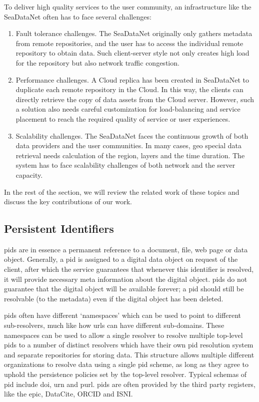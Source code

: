 \documentclass[conference]{IEEEtran}
\begin{document}
To deliver high quality services to the user community, an infrastructure like the SeaDataNet often has to face several challenges:
\begin{enumerate}
    \item Fault tolerance challenges. The SeaDataNet originally only gathers metadata from remote repositories, and the user has to access the individual remote repository to obtain data. Such client-server style not only creates high load for the repository but also network traffic congestion.
    \item Performance challenges. A Cloud replica has been created in SeaDataNet to duplicate each remote repository in the Cloud. In this way, the clients can directly retrieve the copy of data assets from the Cloud server. However, such a solution also needs careful customization for load-balancing and service placement to reach the required quality of service or user experiences.
    \item Scalability challenges. The SeaDataNet faces the continuous growth of both data providers and the user communities. In many cases, geo special data retrieval needs calculation of the region, layers and the time duration. The system has to face scalability challenges of both network and the server capacity. 
\end{enumerate}
In the rest of the section, we will review the related work of these topics and discuss the key contributions of our work. 

\subsection{Persistent Identifiers}
\label{sec:pids}

\glspl{pid} are in essence a permanent reference to a document, file, web page or data object. Generally, a \gls{pid} is assigned to a digital data object on request of the client, after which the service guarantees that whenever this identifier is resolved, it will provide necessary meta information about the digital object. \glspl{pid} do not guarantee that the digital object will be available forever; a \gls{pid} should still be resolvable (to the metadata) even if the digital object has been deleted. 

\glspl{pid} often have different `namespaces' which can be used to point to different sub-resolvers, much like how \glspl{url} can have different sub-domains. These namespaces can be used to allow a single resolver to resolve multiple top-level \glspl{pid} to a number of distinct resolvers which have their own \gls{pid} resolution system and separate repositories for storing data. This structure allows multiple different organizations to resolve data using a single \gls{pid} scheme, as long as they agree to uphold the persistence policies set by the top-level resolver. Typical schemas of \gls{pid} include \gls{doi}, \gls{urn} and \gls{purl}. \glspl{pid} are often provided by the third party registers, like the \gls{epic}, DataCite, ORCID and ISNI. 
\end{document}
